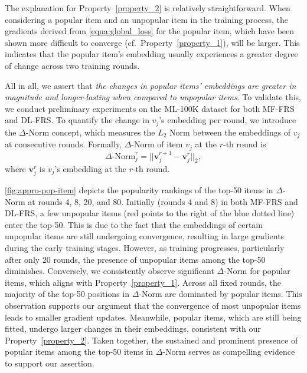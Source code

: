 The explanation for Property~\ref{property_2} is relatively straightforward. When considering a popular item and an unpopular item in the training process, the gradients derived from \cref{equa:global_loss} for the popular item, which have been shown more difficult to converge (cf.\ Property~\ref{property_1}), will be larger. This indicates that the popular item's embedding usually experiences a greater degree of change across two training rounds.

All in all, we assert that \emph{the changes in popular items' embeddings are greater in magnitude and longer-lasting when compared to unpopular items}.
To validate this, we conduct preliminary experiments on the ML-100K dataset for both MF-FRS and DL-FRS.
To quantify the change in $v_j$'s embedding per round, we introduce the $\Delta$-Norm concept, which measures the $L_2$ Norm between the embeddings of $v_j$ at consecutive rounds. Formally, $\Delta$-Norm of item $v_j$ at the $r$-th round is 
\begin{equation}
\Delta\text{-Norm}_j^r = ||\mathbf{v}_j^{r+1}-\mathbf{v}_j^r||_2,
\end{equation}
where $\mathbf{v}_j^r$ is $v_j$'s embedding at the $r$-th round.

\cref{fig:appro-pop-item} depicts the popularity rankings of the top-50 items in $\Delta$-Norm at rounds 4, 8, 20, and 80.
Initially (rounds 4 and 8) in both MF-FRS and DL-FRS, a few unpopular items (red points to the right of the blue dotted line) enter the top-50. This is due to the fact that the embeddings of certain unpopular items are still undergoing convergence, resulting in large gradients during the early training stages.
However, as training progresses, particularly after only 20 rounds, the presence of unpopular items among the top-50 diminishes. 
Conversely, we consistently observe significant $\Delta$-Norm for popular items, which aligns with Property~\ref{property_1}.
Across all fixed rounds, the majority of the top-50 positions in $\Delta$-Norm are dominated by popular items. This observation supports our argument that the convergence of most unpopular items leads to smaller gradient updates. Meanwhile, popular items, which are still being fitted, undergo larger changes in their embeddings, consistent with our Property~\ref{property_2}.
Taken together, the sustained and prominent presence of popular items among the top-50 items in $\Delta$-Norm serves as compelling evidence to support our assertion.


